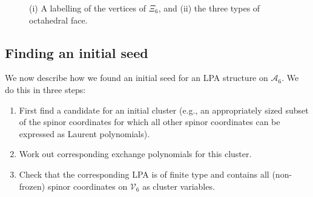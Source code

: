 \documentclass[10pt,a4paper]{amsart}
\numberwithin{equation}{section}
\theoremstyle{definition}
\newcommand{\setupCayleynodes}{
 \draw[gray!30] (0,0) circle (1cm);
 \draw[gray!30] (0,0) circle (0.5176cm);
 \foreach \i in {0,...,11} {
 \node[gray!30] at ({cos(30*\i)},{sin(30*\i)}) {\tiny $\bullet$};
 \node[gray!30] at ({sqrt(2-sqrt(3))*cos(30*\i+15)},{sqrt(2-sqrt(3))*sin(30*\i+15)}) {\tiny $\bullet$};
 \node[gray!30] at (0,0) {\tiny $\bullet$};
 }

 \node[inner sep=-3pt] (a0) at ({cos( 0)},{sin( 0)}) {};
 \node[inner sep=-3pt] (a1) at ({cos( 30)},{sin( 30)}) {};
 \node[inner sep=-3pt] (a2) at ({cos( 60)},{sin( 60)}) {};
 \node[inner sep=-3pt] (a3) at ({cos( 90)},{sin( 90)}) {};
 \node[inner sep=-3pt] (a4) at ({cos(120)},{sin(120)}) {};
 \node[inner sep=-3pt] (a5) at ({cos(150)},{sin(150)}) {};
 \node[inner sep=-3pt] (a6) at ({cos(180)},{sin(180)}) {};
 \node[inner sep=-3pt] (a7) at ({cos(210)},{sin(210)}) {};
 \node[inner sep=-3pt] (a8) at ({cos(240)},{sin(240)}) {};
 \node[inner sep=-3pt] (a9) at ({cos(270)},{sin(270)}) {};
 \node[inner sep=-3pt] (a10) at ({cos(300)},{sin(300)}) {};
 \node[inner sep=-3pt] (a11) at ({cos(330)},{sin(330)}) {};

 \node[inner sep=-3pt] (b0) at ({cos( 0+15)*sqrt(2-sqrt(3))},{sin( 0+15)*sqrt(2-sqrt(3))}) {};
 \node[inner sep=-3pt] (b1) at ({cos( 30+15)*sqrt(2-sqrt(3))},{sin( 30+15)*sqrt(2-sqrt(3))}) {};
 \node[inner sep=-3pt] (b2) at ({cos( 60+15)*sqrt(2-sqrt(3))},{sin( 60+15)*sqrt(2-sqrt(3))}) {};
 \node[inner sep=-3pt] (b3) at ({cos( 90+15)*sqrt(2-sqrt(3))},{sin( 90+15)*sqrt(2-sqrt(3))}) {};
 \node[inner sep=-3pt] (b4) at ({cos(120+15)*sqrt(2-sqrt(3))},{sin(120+15)*sqrt(2-sqrt(3))}) {};
 \node[inner sep=-3pt] (b5) at ({cos(150+15)*sqrt(2-sqrt(3))},{sin(150+15)*sqrt(2-sqrt(3))}) {};
 \node[inner sep=-3pt] (b6) at ({cos(180+15)*sqrt(2-sqrt(3))},{sin(180+15)*sqrt(2-sqrt(3))}) {};
 \node[inner sep=-3pt] (b7) at ({cos(210+15)*sqrt(2-sqrt(3))},{sin(210+15)*sqrt(2-sqrt(3))}) {};
 \node[inner sep=-3pt] (b8) at ({cos(240+15)*sqrt(2-sqrt(3))},{sin(240+15)*sqrt(2-sqrt(3))}) {};
 \node[inner sep=-3pt] (b9) at ({cos(270+15)*sqrt(2-sqrt(3))},{sin(270+15)*sqrt(2-sqrt(3))}) {};
 \node[inner sep=-3pt] (b10) at ({cos(300+15)*sqrt(2-sqrt(3))},{sin(300+15)*sqrt(2-sqrt(3))}) {};
 \node[inner sep=-3pt] (b11) at ({cos(330+15)*sqrt(2-sqrt(3))},{sin(330+15)*sqrt(2-sqrt(3))}) {};}
\begin{document}
\begin{figure}[ht!]
\caption{(i) A labelling of the vertices of $\Xi_6$, and (ii) the three types of octahedral face.}\label{fig!cayley-plane}
\end{figure}

\subsection{Finding an initial seed}

We now describe how we found an initial seed for an LPA structure on $\mathcal A_6$. We do this in three steps:
\begin{enumerate}\itemsep=0pt
\item[(1)] First find a candidate for an initial cluster (e.g., an appropriately sized subset of the spinor coordinates for which all other spinor coordinates can be expressed as Laurent polynomials).
\item[(2)] Work out corresponding exchange polynomials for this cluster.
\item[(3)] Check that the corresponding LPA is of finite type and contains all (non-frozen) spinor coordinates on $\mathcal V_6$ as cluster variables.
\end{enumerate}
\end{document}
